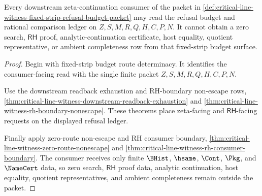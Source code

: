 \begin{theorem}
\label{thm:critical-line-witness-fixed-strip-zeta-consumer-boundary}
Every downstream zeta-continuation consumer of the packet in \autoref{def:critical-line-witness-fixed-strip-refusal-budget-packet} may read the refusal budget and rational comparison ledger on $Z,S,M,R,Q,H,C,P,N$. It cannot obtain a zero search, $\mathsf{RH}$ proof, analytic-continuation certificate, host equality, quotient representative, or ambient completeness row from that fixed-strip budget surface.
\end{theorem}
\begin{proof}
Begin with fixed-strip budget route determinacy. It identifies the consumer-facing read with the single finite packet $Z,S,M,R,Q,H,C,P,N$.

Use the downstream readback exhaustion and RH-boundary non-escape rows, \autoref{thm:critical-line-witness-downstream-readback-exhaustion} and \autoref{thm:critical-line-witness-rh-boundary-nonescape}. These theorems place zeta-facing and $\mathsf{RH}$-facing requests on the displayed refusal ledger.

Finally apply zero-route non-escape and RH consumer boundary, \autoref{thm:critical-line-witness-zero-route-nonescape} and \autoref{thm:critical-line-witness-rh-consumer-boundary}. The consumer receives only finite $\BHist$, $\hsame$, $\Cont$, $\Pkg$, and $\NameCert$ data, so zero search, $\mathsf{RH}$ proof data, analytic continuation, host equality, quotient representatives, and ambient completeness remain outside the packet.
\end{proof}

